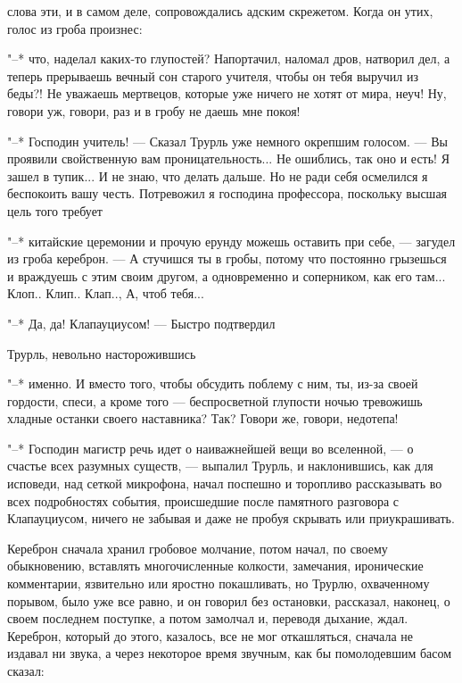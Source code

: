 слова эти, и в самом деле, сопровождались адским
скрежетом. Когда он утих, голос из гроба произнес:

"--* что, наделал каких-то глупостей? Напортачил, наломал
дров, натворил дел, а теперь прерываешь вечный сон старого
учителя, чтобы он тебя выручил из беды?! Не уважаешь
мертвецов, которые уже ничего не хотят от мира, неуч! Ну,
говори уж, говори, раз и в гробу не даешь мне покоя!

"--* Господин учитель! --- Сказал Трурль уже немного
окрепшим голосом. --- Вы проявили свойственную вам
проницательность... Не ошиблись, так оно и есть! Я зашел в
тупик... И не знаю, что делать дальше. Но не ради себя
осмелился я беспокоить вашу честь. Потревожил я господина
профессора, поскольку высшая цель того требует

"--* китайские церемонии и прочую ерунду можешь оставить
при себе, --- загудел из гроба кереброн. --- А стучишся ты в
гробы, потому что постоянно грызешься и враждуешь с этим
своим другом, а одновременно и соперником, как его там...
Клоп.. Клип.. Клап.., А, чтоб тебя...

"--* Да, да! Клапауциусом! --- Быстро подтвердил

Трурль, невольно насторожившись

"--* именно. И вместо того, чтобы обсудить поблему с ним,
ты, из-за своей гордости, спеси, а кроме того --- беспросветной
глупости ночью тревожишь хладные останки
своего наставника? Так? Говори же, говори, недотепа!

"--* Господин магистр речь идет о наиважнейшей вещи во
вселенной, --- о счастье всех разумных существ, --- выпалил
Трурль, и наклонившись, как для исповеди, над сеткой
микрофона, начал поспешно и торопливо рассказывать во всех
подробностях события, происшедшие после памятного разговора
с Клапауциусом, ничего не забывая и даже не пробуя скрывать
или приукрашивать.

Кереброн сначала хранил гробовое молчание, потом начал,
по своему обыкновению, вставлять многочисленные колкости,
замечания, иронические комментарии, язвительно или яростно
покашливать, но Трурлю, охваченному порывом, было уже все
равно, и он говорил без остановки, рассказал, наконец, о
своем последнем поступке, а потом замолчал и, переводя
дыхание, ждал. Кереброн, который до этого, казалось, все не
мог откашляться, сначала не издавал ни звука, а через
некоторое время звучным, как бы помолодевшим басом сказал:

